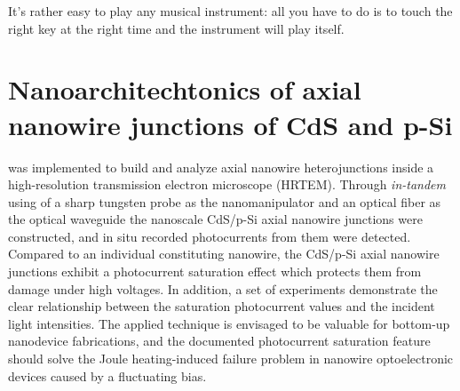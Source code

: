 \begin{savequote}[75mm] 
It's rather easy to play any musical instrument: all you have to do is to touch the right key at the right time and the instrument will play itself.
\end{savequote}

\chapter{Nanoarchitechtonics of axial nanowire junctions of CdS and p-Si}

 was implemented to build and analyze axial nanowire heterojunctions inside a high-resolution transmission electron microscope (HRTEM). Through {\em in-tandem} using of a sharp tungsten probe as the nanomanipulator and an optical fiber as the optical waveguide the nanoscale CdS/p-Si axial nanowire junctions were constructed, and in situ recorded photocurrents from them were detected. Compared to an individual constituting nanowire, the CdS/p-Si axial nanowire junctions exhibit a photocurrent saturation effect which protects them from damage under high voltages. In addition, a set of experiments demonstrate the clear relationship between the saturation photocurrent values and the incident light intensities. The applied technique is envisaged to be valuable for bottom-up nanodevice fabrications, and the documented photocurrent saturation feature should solve the Joule heating-induced failure problem in nanowire optoelectronic devices caused by a fluctuating bias. 


